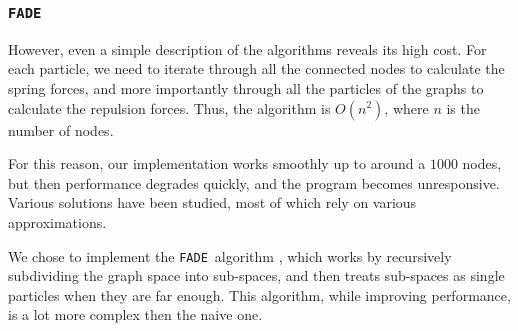 \documentclass[a4paper,11pt,titlepage]{article}
\newcommand{\FADE}{\texttt{FADE}\ }
\begin{document}
\subsubsection{\FADE}

However, even a simple description of the algorithms reveals its high
cost. For each particle, we need to iterate through all the connected
nodes to calculate the spring forces, and more importantly through all
the particles of the graphs to calculate the repulsion forces. Thus,
the algorithm is \(O(n^2)\), where \(n\) is the number of nodes.

For this reason, our implementation works smoothly up to around a
\(1000\) nodes, but then performance degrades quickly, and the program
becomes unresponsive. Various solutions have been studied, most of
which rely on various approximations.

We chose to implement the \FADE algorithm \cite{fade}, which works by
recursively subdividing the graph space into sub-spaces, and then
treats sub-spaces as single particles when they are far enough. This
algorithm, while improving performance, is a lot more complex then the
naive one.
\end{document}

